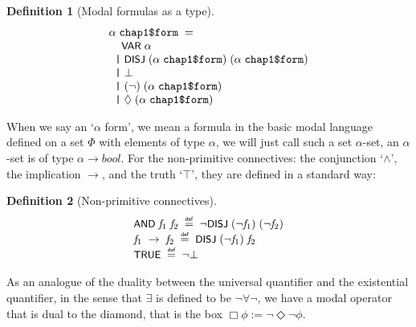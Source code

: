 \documentclass[letterpaper]{article}
\newtheorem{defn}{Definition}
\renewcommand{\HOLConst}[1]{{\textsf{\upshape\small #1}}}
\newenvironment{holmath}{\begin{displaymath}\begin{array}{l}}{\end{array}\end{displaymath}\ignorespacesafterend}
\begin{document}
\begin{defn}[Modal formulas as a type]
\begin{holmath}
  \ensuremath{\alpha}\;\HOLTyOp{chap1\$form}\;=\\
\;\;\;\;\HOLConst{VAR}\;\ensuremath{\alpha}\\
\;\;\HOLTokenBar{}\;\HOLConst{DISJ}\;(\ensuremath{\alpha}\;\HOLTyOp{chap1\$form})\;(\ensuremath{\alpha}\;\HOLTyOp{chap1\$form})\\
\;\;\HOLTokenBar{}\;\HOLSymConst{\ensuremath{\bot}}\\
\;\;\HOLTokenBar{}\;(\HOLSymConst{\HOLTokenNeg{}})\;(\ensuremath{\alpha}\;\HOLTyOp{chap1\$form})\\
\;\;\HOLTokenBar{}\;\HOLSymConst{\ensuremath{\Diamond}}\;(\ensuremath{\alpha}\;\HOLTyOp{chap1\$form})
\end{holmath}
\end{defn}

When we say an `$\alpha$ form', we mean a formula in the basic modal language defined on a set $\Phi$ with elements of type $\alpha$, we will just call such a set $\alpha$-set, an $\alpha$-set is of type $\alpha \to bool$. For the non-primitive connectives: the conjunction `$\land$', the implication $\to$, and the truth `$\top$', they are defined in a standard way:

\begin{defn}[Non-primitive connectives]
\begin{holmath}
  \HOLConst{AND}\;\HOLFreeVar{f\sb{\mathrm{1}}}\;\HOLFreeVar{f\sb{\mathrm{2}}}\;\HOLSymConst{\HOLTokenDefEquality{}}\;\HOLSymConst{\HOLTokenNeg{}}\HOLConst{DISJ}\;(\HOLSymConst{\HOLTokenNeg{}}\HOLFreeVar{f\sb{\mathrm{1}}})\;(\HOLSymConst{\HOLTokenNeg{}}\HOLFreeVar{f\sb{\mathrm{2}}})\\
  \HOLFreeVar{f\sb{\mathrm{1}}}\;\HOLSymConst{\ensuremath{\rightarrow}}\;\HOLFreeVar{f\sb{\mathrm{2}}}\;\HOLSymConst{\HOLTokenDefEquality{}}\;\HOLConst{DISJ}\;(\HOLSymConst{\HOLTokenNeg{}}\HOLFreeVar{f\sb{\mathrm{1}}})\;\HOLFreeVar{f\sb{\mathrm{2}}}\\
  \HOLConst{TRUE}\;\HOLSymConst{\HOLTokenDefEquality{}}\;\HOLSymConst{\HOLTokenNeg{}}\HOLSymConst{\ensuremath{\bot}}
\end{holmath}
\end{defn}
As an analogue of the duality between the universal quantifier and the existential quantifier, in the sense that $\exists$ is defined to be $\lnot\forall\lnot$, we have a modal operator that is dual to the diamond, that is the box $\Box \phi:= \lnot\Diamond \lnot \phi$. 
\end{document}
